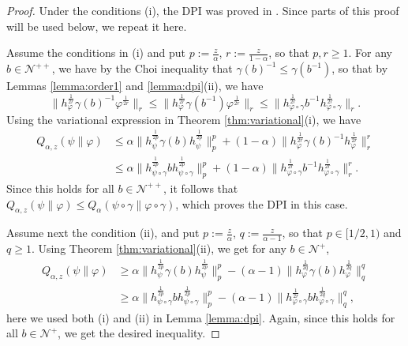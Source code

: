 \documentclass[12pt]{article}
\theoremstyle{definition}
\theoremstyle{remark}
\numberwithin{equation}{section}
\def\Ne{\mathcal N}
\begin{document}
\begin{proof}
Under the conditions (i), the DPI was proved in \cite[Theorem 1(viii)]{kato2023onrenyi}.
Since parts of this proof will be used below, we repeat it here.

Assume the conditions in (i) and put $p:=\frac{z}{\alpha}$, $r:=\frac{z}{1-\alpha}$, so that $p,r\ge 1$. 
For any $b\in \Ne^{++}$, we have by  the Choi inequality \cite{choi1974aschwarz} 
that  $\gamma(b)^{-1}\le \gamma(b^{-1})$, so that  by Lemmas \ref{lemma:order1} and
\ref{lemma:dpi}(ii), we have 
\begin{equation}\label{eq:ineq}
\Big\|h_\varphi^{\frac{1}{2r}}\gamma(b)^{-1}\varphi^{\frac{1}{2r}}\Big\|_r\le
\Big\|h_\varphi^{\frac{1}{2r}}\gamma(b^{-1})\varphi^{\frac{1}{2r}}\Big\|_r\le
\Big\|h_{\varphi\circ\gamma}^{\frac{1}{2r}}b^{-1}h_{\varphi\circ\gamma}^{\frac{1}{2r}}\Big\|_r.
\end{equation}
Using the variational expression in Theorem \ref{thm:variational}(i), we have
\begin{align*}
Q_{\alpha,z}(\psi\|\varphi)&\le \alpha\|h_\psi^{\frac{1}{2p}}\gamma(b)h_\psi^{\frac{1}{2p}}\|_p^p+
(1-\alpha)\|h_\varphi^{\frac{1}{2r}}\gamma(b)^{-1}h_\varphi^{\frac{1}{2r}}\|_r^r\\
&\le  \alpha\|h_{\psi\circ\gamma}^{\frac{1}{2p}}bh_{\psi\circ\gamma}^{\frac{1}{2p}}\|_p^p+
(1-\alpha)\|h_{\varphi\circ\gamma}^{\frac{1}{2r}}b^{-1}h_{\varphi\circ\gamma}^{\frac{1}{2r}}\|_r^r.
\end{align*}
 Since this holds for all
$b\in \Ne^{++}$, it follows that $Q_{\alpha,z}(\psi\|\varphi)\le
Q_{\alpha}(\psi\circ\gamma\|\varphi\circ\gamma)$, which proves the DPI in this case.

Assume next the condition (ii), and put $p:=\frac{z}{\alpha}$, $q:=\frac{z}{\alpha-1}$, so
that $p\in [1/2,1)$ and $q\ge 1$. Using Theorem
\ref{thm:variational}(ii), we get for any $b\in \Ne^+$,
\begin{align*}
Q_{\alpha,z}(\psi\|\varphi)&\ge
\alpha\|h_\psi^{\frac{1}{2p}}\gamma(b)h_\psi^{\frac{1}{2p}}\|_p^p-
(\alpha-1)\|h_\varphi^{\frac{1}{2q}}\gamma(b)h_\varphi^{\frac{1}{2q}}\|_q^q\\
&\ge \alpha\|h_{\psi\circ\gamma}^{\frac{1}{2p}}bh_{\psi\circ\gamma}^{\frac{1}{2p}}\|_p^p-
(\alpha-1)\|h_{\varphi\circ\gamma}^{\frac{1}{2r}}bh_{\varphi\circ\gamma}^{\frac{1}{2q}}\|_q^q,
\end{align*}
here we used both (i) and (ii) in Lemma \ref{lemma:dpi}. Again, since this holds for all
$b\in \Ne^+$, we get the desired inequality.
\end{proof}
\end{document}
